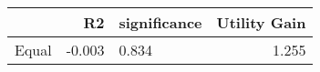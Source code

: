 \begin{tabular}{lrlr}
\toprule
{} &     R2 & significance &  Utility Gain \\
\midrule
Equal & -0.003 &       0.834  &         1.255 \\
\bottomrule
\end{tabular}
